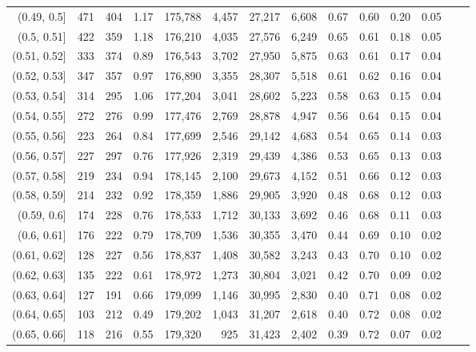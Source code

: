 \begin{tabular}{rrrrrrrrrrrrrr}
(0.49, 0.5]    &    471 &  404 &    1.17 &  175,788 &    4,457 &  27,217 &   6,608 &  0.67 &  0.60 &  0.20 &      0.05 \\
(0.5, 0.51]    &    422 &  359 &    1.18 &  176,210 &    4,035 &  27,576 &   6,249 &  0.65 &  0.61 &  0.18 &      0.05 \\
(0.51, 0.52]   &    333 &  374 &    0.89 &  176,543 &    3,702 &  27,950 &   5,875 &  0.63 &  0.61 &  0.17 &      0.04 \\
(0.52, 0.53]   &    347 &  357 &    0.97 &  176,890 &    3,355 &  28,307 &   5,518 &  0.61 &  0.62 &  0.16 &      0.04 \\
(0.53, 0.54]   &    314 &  295 &    1.06 &  177,204 &    3,041 &  28,602 &   5,223 &  0.58 &  0.63 &  0.15 &      0.04 \\
(0.54, 0.55]   &    272 &  276 &    0.99 &  177,476 &    2,769 &  28,878 &   4,947 &  0.56 &  0.64 &  0.15 &      0.04 \\
(0.55, 0.56]   &    223 &  264 &    0.84 &  177,699 &    2,546 &  29,142 &   4,683 &  0.54 &  0.65 &  0.14 &      0.03 \\
(0.56, 0.57]   &    227 &  297 &    0.76 &  177,926 &    2,319 &  29,439 &   4,386 &  0.53 &  0.65 &  0.13 &      0.03 \\
(0.57, 0.58]   &    219 &  234 &    0.94 &  178,145 &    2,100 &  29,673 &   4,152 &  0.51 &  0.66 &  0.12 &      0.03 \\
(0.58, 0.59]   &    214 &  232 &    0.92 &  178,359 &    1,886 &  29,905 &   3,920 &  0.48 &  0.68 &  0.12 &      0.03 \\
(0.59, 0.6]    &    174 &  228 &    0.76 &  178,533 &    1,712 &  30,133 &   3,692 &  0.46 &  0.68 &  0.11 &      0.03 \\
(0.6, 0.61]    &    176 &  222 &    0.79 &  178,709 &    1,536 &  30,355 &   3,470 &  0.44 &  0.69 &  0.10 &      0.02 \\
(0.61, 0.62]   &    128 &  227 &    0.56 &  178,837 &    1,408 &  30,582 &   3,243 &  0.43 &  0.70 &  0.10 &      0.02 \\
(0.62, 0.63]   &    135 &  222 &    0.61 &  178,972 &    1,273 &  30,804 &   3,021 &  0.42 &  0.70 &  0.09 &      0.02 \\
(0.63, 0.64]   &    127 &  191 &    0.66 &  179,099 &    1,146 &  30,995 &   2,830 &  0.40 &  0.71 &  0.08 &      0.02 \\
(0.64, 0.65]   &    103 &  212 &    0.49 &  179,202 &    1,043 &  31,207 &   2,618 &  0.40 &  0.72 &  0.08 &      0.02 \\
(0.65, 0.66]   &    118 &  216 &    0.55 &  179,320 &      925 &  31,423 &   2,402 &  0.39 &  0.72 &  0.07 &      0.02 \\

\end{tabular}
